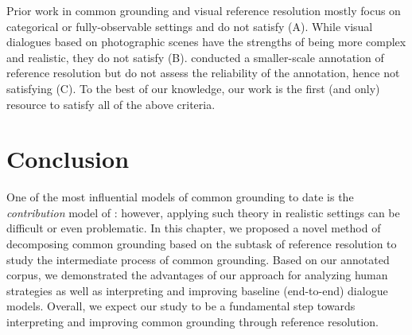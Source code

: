 Prior work in common grounding \citep{potts2012goal,de2017guesswhat} and visual reference resolution \citep{tokunaga-etal-2012-rex,zarriess-etal-2016-pentoref} mostly focus on categorical or fully-observable settings and do not satisfy (A). While visual dialogues based on photographic scenes \citep{das2017visual,haber-etal-2019-photobook,ilinykh2019meetup} have the strengths of being more complex and realistic, they do not satisfy (B). \citet{gotze-boye-2016-spaceref} conducted a smaller-scale annotation of reference resolution but do not assess the reliability of the annotation, hence not satisfying (C). To the best of our knowledge, our work is the first (and only) resource to satisfy all of the above criteria.

\section{Conclusion}
\label{04_sec:conclusion}

One of the most influential models of common grounding to date is the \textit{contribution} model of \citet{clark1989contributing}: however, applying such theory in realistic settings can be difficult or even problematic. In this chapter, we proposed a novel method of decomposing common grounding based on the subtask of reference resolution to study the intermediate process of common grounding. Based on our annotated corpus, we demonstrated the advantages of our approach for analyzing human strategies as well as interpreting and improving baseline (end-to-end) dialogue models. Overall, we expect our study to be a fundamental step towards interpreting and improving common grounding through reference resolution.
